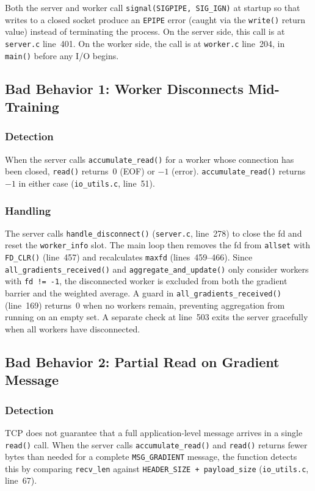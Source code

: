 \documentclass[11pt]{article}
\begin{document}
Both the server and worker call \texttt{signal(SIGPIPE, SIG\_IGN)} at startup
so that writes to a closed socket produce an \texttt{EPIPE} error (caught via
the \texttt{write()} return value) instead of terminating the process. On the
server side, this call is at \texttt{server.c} line~401. On the worker side,
the call is at \texttt{worker.c} line~204, in \texttt{main()} before any I/O
begins.

\subsection{Bad Behavior 1: Worker Disconnects Mid-Training}

\subsubsection*{Detection}
When the server calls \texttt{accumulate\_read()} for a worker whose connection
has been closed, \texttt{read()} returns~0 (EOF) or $-1$ (error).
\texttt{accumulate\_read()} returns $-1$ in either case (\texttt{io\_utils.c},
line~51).

\subsubsection*{Handling}
The server calls \texttt{handle\_disconnect()} (\texttt{server.c}, line~278) to
close the fd and reset the \texttt{worker\_info} slot. The main loop then
removes the fd from \texttt{allset} with \texttt{FD\_CLR()} (line~457) and
recalculates \texttt{maxfd} (lines~459--466). Since
\texttt{all\_gradients\_received()} and \texttt{aggregate\_and\_update()} only
consider workers with \texttt{fd != -1}, the disconnected worker is excluded
from both the gradient barrier and the weighted average. A guard in
\texttt{all\_gradients\_received()} (line~169) returns~0 when no workers remain,
preventing aggregation from running on an empty set. A separate check at line~503 exits the server
gracefully when all workers have disconnected.

\subsection{Bad Behavior 2: Partial Read on Gradient Message}

\subsubsection*{Detection}
TCP does not guarantee that a full application-level message arrives in a single
\texttt{read()} call. When the server calls \texttt{accumulate\_read()} and
\texttt{read()} returns fewer bytes than needed for a complete
\texttt{MSG\_GRADIENT} message, the function detects this by comparing
\texttt{recv\_len} against \texttt{HEADER\_SIZE + payload\_size}
(\texttt{io\_utils.c}, line~67).
\end{document}
